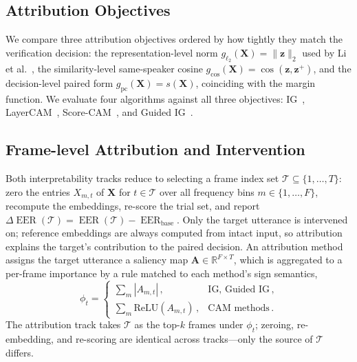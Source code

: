 \documentclass{article}
\DeclareMathOperator{\EER}{EER}
\newcommand{\dEER}{\Delta\EER}
\begin{document}
\subsection{Attribution Objectives}

We compare three attribution objectives ordered by how tightly they match the verification decision: the representation-level norm $g_{\ell_2}(\mathbf{X})=\|\mathbf{z}\|_2$ used by Li et al.~\cite{zhang2023visualizing}, the similarity-level same-speaker cosine $g_{\cos}(\mathbf{X})=\cos(\mathbf{z},\mathbf{z}^{+})$, and the decision-level paired form $g_{\mathrm{pc}}(\mathbf{X})=s(\mathbf{X})$, coinciding with the margin function. We evaluate four algorithms against all three objectives: IG~\cite{sundararajan2017axiomatic}, LayerCAM~\cite{jiang2021layercam}, Score-CAM~\cite{wang2020scorecam}, and Guided IG~\cite{kapishnikov2021guided}.

\subsection{Frame-level Attribution and Intervention}

Both interpretability tracks reduce to selecting a frame index set $\mathcal{T}\subseteq\{1,\ldots,T\}$: zero the entries $X_{m,t}$ of $\mathbf{X}$ for $t\in\mathcal{T}$ over all frequency bins $m\in\{1,\ldots,F\}$, recompute the embeddings, re-score the trial set, and report $\dEER(\mathcal{T})=\EER(\mathcal{T})-\EER_{\mathrm{base}}$. Only the target utterance is intervened on; reference embeddings are always computed from intact input, so attribution explains the target's contribution to the paired decision. An attribution method assigns the target utterance a saliency map $\mathbf{A}\in\mathbb{R}^{F\times T}$, which is aggregated to a per-frame importance by a rule matched to each method's sign semantics,
\begin{equation}
  \phi_t = \begin{cases} \sum_{m} |A_{m,t}|\,, & \text{IG, Guided IG}\,, \\[1pt] \sum_{m} \mathrm{ReLU}\!\left(A_{m,t}\right)\,, & \text{CAM methods}\,. \end{cases}
  \label{eq:phi}
\end{equation}
The attribution track takes $\mathcal{T}$ as the top-$k$ frames under $\phi_t$; zeroing, re-embedding, and re-scoring are identical across tracks---only the source of $\mathcal{T}$ differs.
\end{document}
